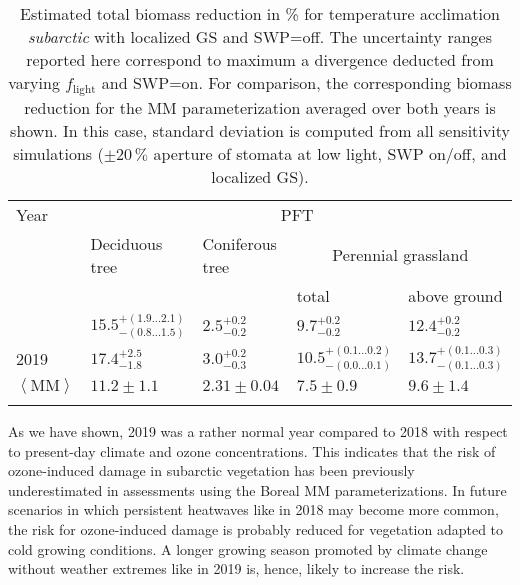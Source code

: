 \documentclass[bg, manuscript]{copernicus}
\begin{document}
\begin{table}[t]
  \caption{Estimated total biomass reduction in \unit{\%} for temperature acclimation \emph{subarctic} with localized GS and SWP=off. The uncertainty ranges reported here correspond to maximum a divergence deducted from varying $f_\mathrm{light}$ and SWP=on. For comparison, the corresponding biomass reduction for the MM parameterization averaged over both years is shown. In this case, standard deviation is computed from all sensitivity simulations ($\pm 20\,\unit{\%}$ aperture of stomata at low light, SWP on/off, and localized GS).}
  \label{tab:biomass_reduction}
\begin{tabular}{lllll}
\tophline
Year & \multicolumn{4}{c}{PFT}\\
& Deciduous tree& Coniferous tree & \multicolumn{2}{c}{Perennial grassland}\\
& & & total & above ground\\
\middlehline
2018 & $15.5^{+(1.9...2.1)}_{-(0.8...1.5)}$ & $2.5^{+0.2}_{-0.2}$ & $9.7^{+0.2}_{-0.2}$ & $12.4^{+0.2}_{-0.2}$\\
2019 & $17.4^{+2.5}_{-1.8}$ & $3.0^{+0.2}_{-0.3}$ & $10.5^{+(0.1...0.2)}_{-(0.0...0.1)}$ & $13.7^{+(0.1...0.3)}_{-(0.1...0.3)}$\\
\middlehline
$\left<\mathrm{MM}\right>$ & $11.2\pm 1.1$ & $2.31\pm 0.04$ & $7.5\pm 0.9$ & $9.6\pm 1.4$\\
\bottomhline
\end{tabular}
\end{table}

As we have shown, 2019 was a rather normal year compared to 2018 with respect to present-day climate and ozone concentrations. This indicates that the risk of ozone-induced damage in subarctic vegetation has been previously underestimated in assessments using the Boreal MM parameterizations. In future scenarios in which persistent heatwaves like in 2018 may become more common, the risk for ozone-induced damage is probably reduced for vegetation adapted to cold growing conditions. A longer growing season promoted by climate change without weather extremes like in 2019 is, hence, likely to increase the risk.

\label{sec:conc}
\end{document}
